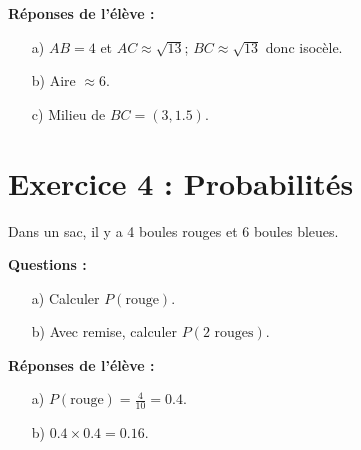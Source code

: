 \documentclass{article}
\begin{document}
\textbf{Réponses de l’élève :}
\begin{enumerate}
    \item[a)] \( AB = 4 \) et \( AC \approx \sqrt{13} \); \( BC \approx \sqrt{13} \) donc isocèle.
    \item[b)] Aire \( \approx 6 \).
    \item[c)] Milieu de \( BC = (3, 1.5) \).
\end{enumerate}

\section*{Exercice 4 : Probabilités}
Dans un sac, il y a 4 boules rouges et 6 boules bleues.

\textbf{Questions :}
\begin{enumerate}
    \item[a)] Calculer \( P(\text{rouge}) \).
    \item[b)] Avec remise, calculer \( P(2 \text{ rouges}) \).
\end{enumerate}

\textbf{Réponses de l’élève :}
\begin{enumerate}
    \item[a)] \( P(\text{rouge}) = \frac{4}{10} = 0.4 \).
    \item[b)] \( 0.4 \times 0.4 = 0.16 \).
\end{enumerate}
\end{document}
